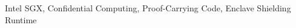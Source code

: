 
\begin{IEEEkeywords}
Intel SGX, Confidential Computing, Proof-Carrying Code, Enclave Shielding Runtime
\end{IEEEkeywords}



